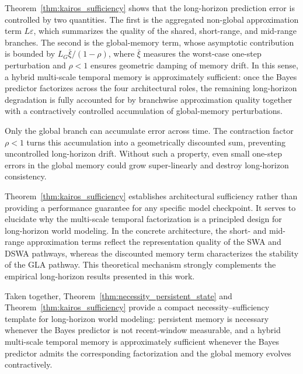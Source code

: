 \begin{remark}
\label{rem:interpretation}
Theorem~\ref{thm:kairos_sufficiency} shows that the long-horizon prediction error is controlled by two quantities. The first is the aggregated non-global approximation term $L\varepsilon$, which summarizes the quality of the shared, short-range, and mid-range branches. The second is the global-memory term, whose asymptotic contribution is bounded by $L_G\bar\xi/(1-\rho)$, where $\bar\xi$ measures the worst-case one-step perturbation and $\rho<1$ ensures geometric damping of memory drift. In this sense, a hybrid multi-scale temporal memory is approximately sufficient: once the Bayes predictor factorizes across the four architectural roles, the remaining long-horizon degradation is fully accounted for by branchwise approximation quality together with a contractively controlled accumulation of global-memory perturbations.
\end{remark}




\begin{remark}
\label{rem:gla_nontrivial}
Only the global branch can accumulate error across time. The contraction factor $\rho<1$ turns this accumulation into a geometrically discounted sum, preventing uncontrolled long-horizon drift. Without such a property, even small one-step errors in the global memory could grow super-linearly and destroy long-horizon consistency.
\end{remark}

\begin{remark}
\label{rem:scope}
Theorem~\ref{thm:kairos_sufficiency} establishes architectural sufficiency rather than providing a performance guarantee for any specific model checkpoint. It serves to elucidate why the multi-scale temporal factorization is a principled design for long-horizon world modeling. In the concrete architecture, the short- and mid-range approximation terms reflect the representation quality of the SWA and DSWA pathways, whereas the discounted memory term characterizes the stability of the GLA pathway. This theoretical mechanism strongly complements the empirical long-horizon results presented in this work.
\end{remark}


\begin{remark}
\label{rem:necessity_sufficiency_pair}
Taken together, Theorem~\ref{thm:necessity_persistent_state} and Theorem~\ref{thm:kairos_sufficiency} provide a compact necessity--sufficiency template for long-horizon world modeling: persistent memory is necessary whenever the Bayes predictor is not recent-window measurable, and a hybrid multi-scale temporal memory is approximately sufficient whenever the Bayes predictor admits the corresponding factorization and the global memory evolves contractively.
\end{remark}